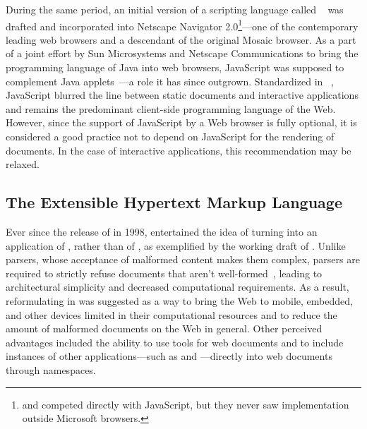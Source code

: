 \begin{figure}
\end{figure}

During the same period, an initial version of a scripting language called
~\cite{ecma97} was drafted and incorporated into Netscape
Navigator 2.0\footnote{
   and  competed directly with JavaScript, but they
  never saw implementation outside Microsoft browsers.
}---one of the contemporary leading web browsers and a descendant of the
original Mosaic browser. As a part of a joint effort by Sun Microsystems and
Netscape Communications to bring the programming language of Java into web
browsers, JavaScript was supposed to complement Java
applets~\cite{netscape95}---a role it has since outgrown. Standardized in
\citeyear{ecma97}~\cite{ecma97}, JavaScript blurred the line between static
documents and interactive applications and remains the predominant client-side
programming language of the Web. However, since the support of JavaScript by a
Web browser is fully optional, it is considered a good practice not to depend on
JavaScript for the rendering of  documents. In the case of
interactive  applications, this recommendation may be relaxed.

\subsection{The Extensible Hypertext Markup Language}
Ever since the release of  in 1998,  entertained the
idea of turning  into an application of , rather than
of , as exemplified by the working draft of .
Unlike  parsers, whose acceptance of malformed content makes them
complex,  parsers are required to strictly refuse 
documents that aren't well-formed~\cite[Section~1.2, Terminology]{bray98},
leading to architectural simplicity and decreased computational requirements. As
a result, reformulating  in  was suggested as a way
to bring the Web to mobile, embedded, and other devices limited in their
computational resources and to reduce the amount of malformed documents on the
Web in general. Other perceived advantages included the ability to use
 tools for web documents and to include instances of other
 applications---such as  and
---directly into web documents through  namespaces.

